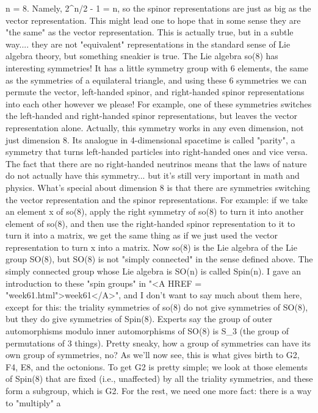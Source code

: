 n = 8.  Namely, 2^{n/2 - 1} = n, so the spinor representations are 
just as big as the vector representation.  This might lead one to hope 
that in some sense they are "the same" as the vector representation.  
This is actually true, but in a subtle way.... they are not "equivalent" 
representations in the standard sense of Lie algebra theory, but something 
sneakier is true.  
The Lie algebra so(8) has interesting symmetries!  It has a little 
symmetry group with 6 elements, the same as the symmetries of a
equilateral triangle, and using these 6 symmetries we can permute the 
vector, left-handed spinor, and right-handed spinor representations 
into each other however we please!  
For example, one of these symmetries switches the left-handed
and right-handed spinor representations, but leaves the vector 
representation alone.  Actually, this symmetry works in any even
dimension, not just dimension 8.  Its analogue in 4-dimensional spacetime
is called "parity", a symmetry that turns left-handed particles
into right-handed ones and vice versa.  The fact that there are
no right-handed neutrinos means that the laws of nature do not actually have
this symmetry... but it's still very important in math and physics.
What's special about dimension 8 is that there are symmetries switching
the vector representation and the spinor representations.  For example:
if we take an element x of so(8), apply the right symmetry of so(8) to turn it 
into another element of so(8), and then use the right-handed spinor
representation to it to turn it into a matrix, we get the same thing as if 
we just used the vector representation to turn x into a matrix.
Now so(8) is the Lie algebra of the Lie group SO(8), but SO(8) is
not "simply connected" in the sense defined above.  The simply connected
group whose Lie algebra is SO(n) is called Spin(n).  I gave an introduction
to these "spin groups" in "<A HREF = "week61.html">week61</A>", and I don't want to say much about
them here, except for this: the triality symmetries of so(8) do not
give symmetries of SO(8), but they do give symmetries of Spin(8).  
Experts say the group of outer automorphisms modulo inner automorphisms 
of SO(8) is S_3 (the group of permutations of 3 things).
Pretty sneaky, how a group of symmetries can have its own group of 
symmetries, no?  As we'll now see, this is what gives birth to 
G2, F4, E8, and the octonions.
To get G2 is pretty simple; we look at those elements of Spin(8) that
are fixed (i.e., unaffected) by all the triality symmetries, and these
form a subgroup, which is G2.   
For the rest, we need one more fact: there is a way to "multiply" a 
